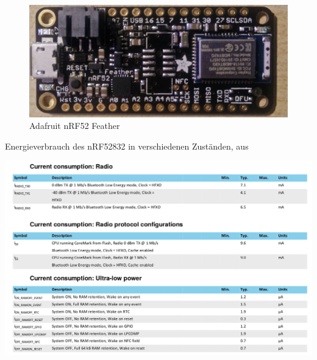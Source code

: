 \begin{figure}[h]
  \centering
	\includegraphics[width=\textwidth]{images/nrf52layout.jpg}
  \caption{Adafruit nRF52 Feather}
  \label{fig:nrf52layout}
\end{figure}

\begin{table}[h]
  \centering
  \caption{Energieverbrauch des nRF52832 in verschiedenen Zuständen, aus \cite{nordic2017nrf}}
	\includegraphics[width=\textwidth]{images/nrf52consumption.png}
  \label{table:nrf52consumption}
\end{table}


